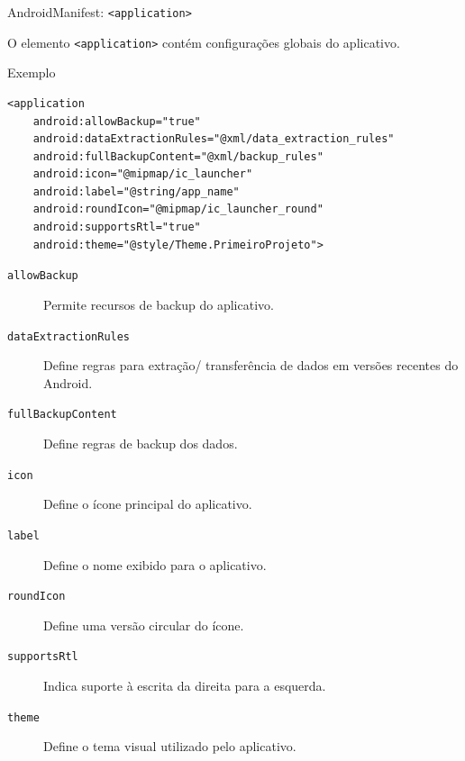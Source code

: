 \documentclass[aspectratio=169]{beamer}
\begin{document}
\begin{frame}[fragile]{AndroidManifest: \texttt{<application>}}
\small

O elemento \texttt{<application>} contém configurações globais do aplicativo.

\begin{block}{Exemplo}
    \tiny

\begin{verbatim}
<application
    android:allowBackup="true"
    android:dataExtractionRules="@xml/data_extraction_rules"
    android:fullBackupContent="@xml/backup_rules"
    android:icon="@mipmap/ic_launcher"
    android:label="@string/app_name"
    android:roundIcon="@mipmap/ic_launcher_round"
    android:supportsRtl="true"
    android:theme="@style/Theme.PrimeiroProjeto">
\end{verbatim}
\end{block}

\begin{description}
    \item[\texttt{allowBackup}] Permite recursos de backup do aplicativo.
    
    \item[\texttt{dataExtractionRules}] Define regras para extração/
    transferência de dados em versões recentes do Android.
    
    \item[\texttt{fullBackupContent}] Define regras de backup dos dados.
    
    \item[\texttt{icon}] Define o ícone principal do aplicativo.
    
    \item[\texttt{label}] Define o nome exibido para o aplicativo.
    
    \item[\texttt{roundIcon}] Define uma versão circular do ícone.
    
    \item[\texttt{supportsRtl}] Indica suporte à escrita da direita para a esquerda.
    
    \item[\texttt{theme}] Define o tema visual utilizado pelo aplicativo.
\end{description}

\end{frame}
\end{document}
